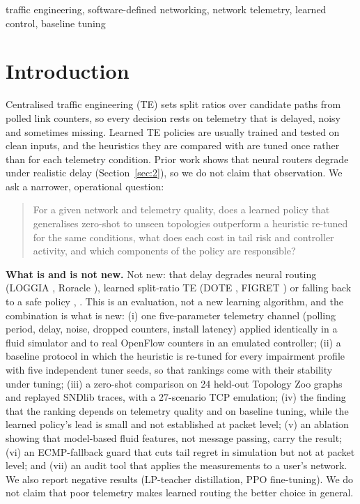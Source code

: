 \documentclass[journal]{IEEEtran}
\begin{document}
\begin{IEEEkeywords}
traffic engineering, software-defined networking, network telemetry, learned control, baseline tuning
\end{IEEEkeywords}

\section{Introduction}
\label{sec:1}
Centralised traffic engineering (TE) sets split ratios over candidate paths from polled link counters, so every decision rests on telemetry that is delayed, noisy and sometimes missing. Learned TE policies are usually trained and tested on clean inputs, and the heuristics they are compared with are tuned once rather than for each telemetry condition. Prior work shows that neural routers degrade under realistic delay (Section~\ref{sec:2}), so we do not claim that observation. We ask a narrower, operational question:

\begin{quote}
For a given network and telemetry quality, does a learned policy that generalises zero-shot to unseen topologies outperform a heuristic re-tuned for the same conditions, what does each cost in tail risk and controller activity, and which components of the policy are responsible?
\end{quote}

\textbf{What is and is not new.} Not new: that delay degrades neural routing (LOGGIA \cite{r7}, Roracle \cite{r6}), learned split-ratio TE (DOTE \cite{r1}, FIGRET \cite{r2}) or falling back to a safe policy \cite{r10}, \cite{r11}. This is an evaluation, not a new learning algorithm, and the combination is what is new: (i) one five-parameter telemetry channel (polling period, delay, noise, dropped counters, install latency) applied identically in a fluid simulator and to real OpenFlow counters in an emulated controller; (ii) a baseline protocol in which the heuristic is re-tuned for every impairment profile with five independent tuner seeds, so that rankings come with their stability under tuning; (iii) a zero-shot comparison on 24 held-out Topology Zoo graphs and replayed SNDlib traces, with a 27-scenario TCP emulation; (iv) the finding that the ranking depends on telemetry quality and on baseline tuning, while the learned policy's lead is small and not established at packet level; (v) an ablation showing that model-based fluid features, not message passing, carry the result; (vi) an ECMP-fallback guard that cuts tail regret in simulation but not at packet level; and (vii) an audit tool that applies the measurements to a user's network. We also report negative results (LP-teacher distillation, PPO fine-tuning). We do not claim that poor telemetry makes learned routing the better choice in general.
\end{document}
